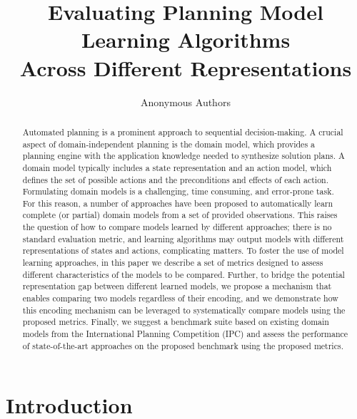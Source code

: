\documentclass{article}
\title{Evaluating Planning Model Learning Algorithms \\ Across Different Representations}
\author{Anonymous Authors}
\theoremstyle{definition}
\theoremstyle{remark}
\newif\ifaddcomments
\newcommand{\leo}[1]{\ifaddcomments{\textcolor{pink}{[Leonardo: #1]}}\fi}
\begin{document}
\maketitle

\begin{abstract}
Automated planning is a prominent approach to sequential decision-making. A crucial aspect of domain-independent planning is the domain model, which provides a planning engine with the application knowledge needed to synthesize solution plans. A domain model typically includes a state representation and an action model, which defines the set of possible actions and the preconditions and effects of each action. 
Formulating domain models is a challenging, time consuming, and error-prone task. For this reason, a number of approaches have been proposed to automatically learn complete (or partial) domain models from a set of provided observations. This raises the question of how to compare models learned by different approaches; there is no standard evaluation metric, and learning algorithms may output models with different representations of states and actions, complicating matters. 
To foster the use of model learning approaches, in this paper we describe a set of metrics designed to assess different characteristics of the models to be compared. Further, to bridge the potential representation gap between different learned models, we propose a mechanism that enables comparing two models regardless of their encoding, and we demonstrate how this encoding mechanism can be leveraged to systematically compare models using the proposed metrics. Finally, we suggest a benchmark suite based on existing domain models from the International Planning Competition (IPC) and assess the performance of state-of-the-art approaches on the proposed benchmark using the proposed metrics. 
\end{abstract}

\section{Introduction}
\end{document}
